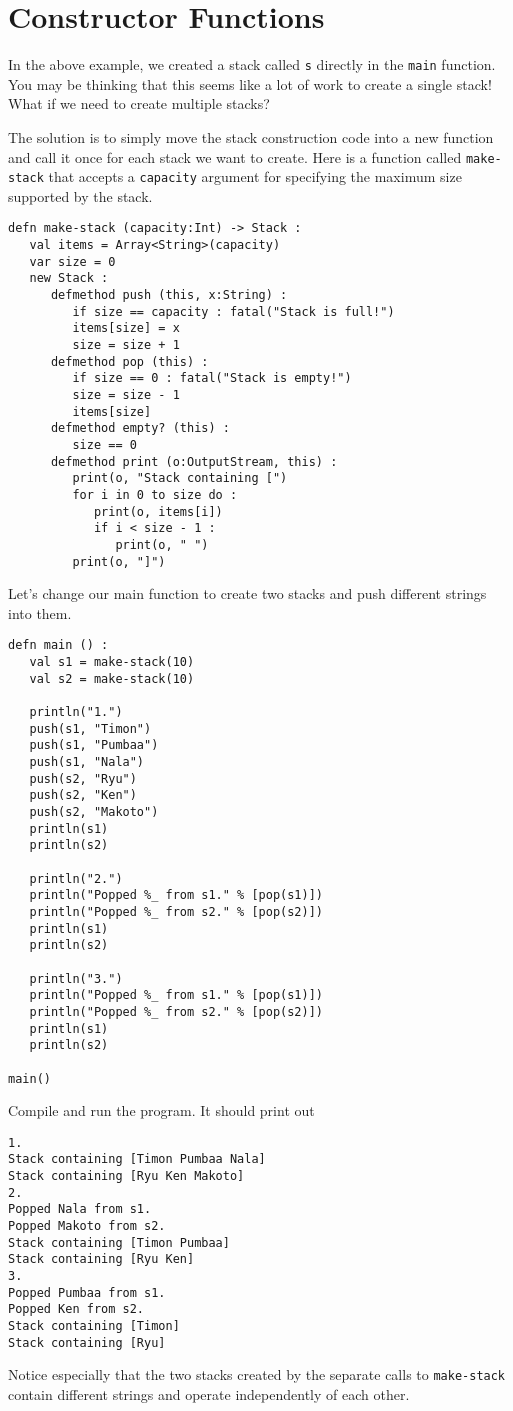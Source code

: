 \documentclass[10pt,oneside]{book}
\begin{document}
\section{Constructor Functions}
In the above example, we created a stack called \texttt{\frenchspacing s} directly in the \texttt{\frenchspacing main} function. You may be thinking that this seems like a lot of work to create a single stack! What if we need to create multiple stacks? 

The solution is to simply move the stack construction code into a new function and call it once for each stack we want to create. Here is a function called \texttt{\frenchspacing make-stack} that accepts a \texttt{\frenchspacing capacity} argument for specifying the maximum size supported by the stack.
\begin{lstlisting}
defn make-stack (capacity:Int) -> Stack :
   val items = Array<String>(capacity)
   var size = 0
   new Stack :
      defmethod push (this, x:String) :
         if size == capacity : fatal("Stack is full!")
         items[size] = x
         size = size + 1
      defmethod pop (this) :
         if size == 0 : fatal("Stack is empty!")
         size = size - 1
         items[size]
      defmethod empty? (this) :
         size == 0
      defmethod print (o:OutputStream, this) :
         print(o, "Stack containing [")
         for i in 0 to size do :
            print(o, items[i])
            if i < size - 1 :
               print(o, " ")
         print(o, "]")   
\end{lstlisting}

Let's change our main function to create two stacks and push different strings into them.
\begin{lstlisting}
defn main () :
   val s1 = make-stack(10)
   val s2 = make-stack(10)

   println("1.")
   push(s1, "Timon")
   push(s1, "Pumbaa")
   push(s1, "Nala")
   push(s2, "Ryu")
   push(s2, "Ken")
   push(s2, "Makoto")
   println(s1)
   println(s2)

   println("2.")
   println("Popped %_ from s1." % [pop(s1)])
   println("Popped %_ from s2." % [pop(s2)])
   println(s1)
   println(s2)

   println("3.")
   println("Popped %_ from s1." % [pop(s1)])
   println("Popped %_ from s2." % [pop(s2)])
   println(s1)
   println(s2)

main()   
\end{lstlisting}

Compile and run the program. It should print out
\begin{lstlisting}
1.
Stack containing [Timon Pumbaa Nala]
Stack containing [Ryu Ken Makoto]
2.
Popped Nala from s1.
Popped Makoto from s2.
Stack containing [Timon Pumbaa]
Stack containing [Ryu Ken]
3.
Popped Pumbaa from s1.
Popped Ken from s2.
Stack containing [Timon]
Stack containing [Ryu]
\end{lstlisting}
Notice especially that the two stacks created by the separate calls to \texttt{\frenchspacing make-stack} contain different strings and operate independently of each other. 
\end{document}
